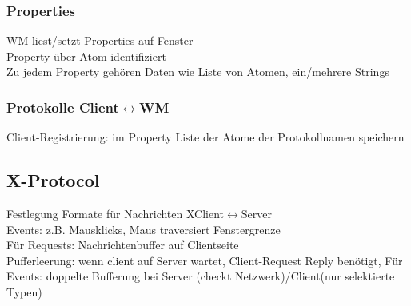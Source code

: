 \subsubsection{Properties}
WM liest/setzt Properties auf Fenster\\
Property über Atom identifiziert\\
Zu jedem Property gehören Daten wie Liste von Atomen, ein/mehrere Strings

\subsubsection{Protokolle Client$\leftrightarrow$WM}
Client-Registrierung: im Property  Liste der Atome der Protokollnamen speichern\\

\subsection{X-Protocol}
Festlegung Formate für Nachrichten XClient$\leftrightarrow$Server\\
Events: z.B. Mausklicks, Maus traversiert Fenstergrenze\\
Für Requests: Nachrichtenbuffer auf Clientseite\\
Pufferleerung: wenn client auf Server wartet, Client-Request Reply benötigt, 
Für Events: doppelte Bufferung bei Server (checkt Netzwerk)/Client(nur selektierte Typen)




